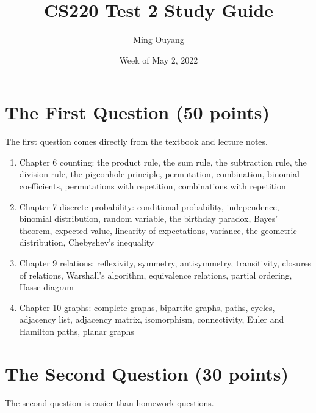 \documentclass[letterpaper, 12pt]{article}
\title{CS220 Test 2 Study Guide}
\author{Ming Ouyang}
\date{Week of May 2, 2022}
\begin{document}
\maketitle

\section{The First Question (50 points)}
The first question comes directly from the textbook and lecture notes.

\begin{enumerate}
    \item Chapter 6 counting: the product rule, the sum rule, the subtraction rule, the division rule, the pigeonhole principle, permutation, combination, binomial coefficients, permutations with repetition, combinations with repetition
    \item Chapter 7 discrete probability:  conditional probability, independence, binomial distribution, random variable, the birthday paradox, Bayes’ theorem, expected value, linearity of expectations, variance, the geometric distribution, Chebyshev’s inequality
    \item Chapter 9 relations: reflexivity, symmetry, antisymmetry, transitivity, closures of relations, Warshall’s algorithm, equivalence relations, partial ordering, Hasse diagram
    \item Chapter 10 graphs: complete graphs, bipartite graphs, paths, cycles, adjacency list, adjacency matrix, isomorphism, connectivity, Euler and Hamilton paths, planar graphs
\end{enumerate}

\section{The Second Question (30 points)}
The second question is easier than homework questions.
\end{document}
